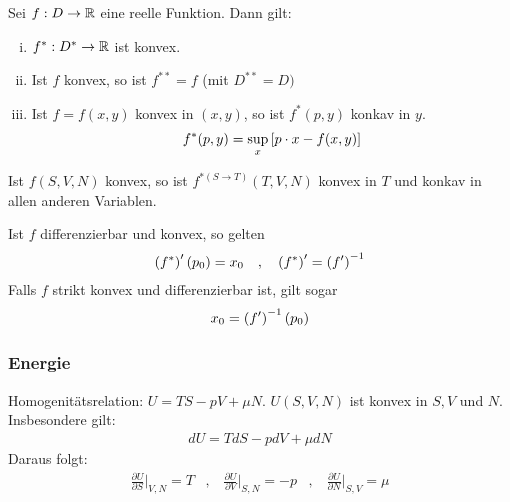 \begin{theorem}
    Sei $f: D \rightarrow \mathbb{R}$ eine reelle Funktion. Dann gilt:
    \begin{enumerate}[(i)]
        \item $f^\ast : D^\ast \rightarrow \mathbb{R}$ ist konvex.
        \item Ist $f$ konvex, so ist $f^{\ast \ast} = f$ (mit $D^{\ast \ast} = D)$
        \item Ist $f=f(x,y)$ konvex in $(x,y)$, so ist $f^\ast (p,y)$ konkav in $y$.
            \begin{align*}
                f^\ast (p,y) = \sup_x \left[ p \cdot x - f(x,y) \right]
            \end{align*}
    \end{enumerate}
    Ist $f(S,V,N)$ konvex, so ist $f^{\ast(S \rightarrow T)} (T,V,N)$ konvex in
    $T$ und konkav in allen anderen Variablen.
\end{theorem}

\begin{bemerkung}
    Ist $f$ differenzierbar und konvex, so gelten
    \begin{align*}
        \left( f^\ast \right)'(p_0) = x_0
        \hspace{10pt} , \hspace{10pt}
        \left( f^\ast \right)' = \left( f' \right)^{-1}
    \end{align*}
    Falls $f$ strikt konvex und differenzierbar ist, gilt sogar
    \begin{align*}
        x_0 = \left( f' \right)^{-1} (p_0)
    \end{align*}
\end{bemerkung}

\subsubsection{Energie}

Homogenitätsrelation: $U = T S - p V + \mu N$. $U(S,V,N)$ ist konvex in $S,V$
und $N$. Insbesondere gilt:
\begin{align*}
    dU = T dS - p dV + \mu dN
\end{align*}
Daraus folgt:
\begin{align*}
    \frac{\partial U}{\partial S} \Big|_{V,N} = T
    \hspace{10pt} , \hspace{10pt}
    \frac{\partial U}{\partial V} \Big|_{S,N} = -p
    \hspace{10pt} , \hspace{10pt}
    \frac{\partial U}{\partial N} \Big|_{S,V} = \mu
\end{align*}

